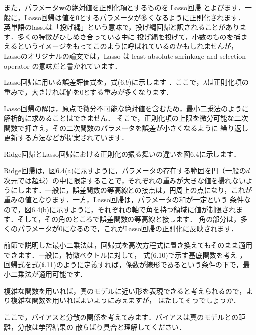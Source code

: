 
また，パラメータ$\bm{w}$の絶対値を正則化項とするものを
Lasso回帰
とよびます．一般に，Lasso回帰は値を0とするパラメータが多くなるように正則化されます．
英単語のlassoは「投げ縄」という意味で，投げ縄回帰と訳されることがあります．多くの特徴がひしめき合っている中に
投げ縄を投げて，小数のものを捕まえるというイメージをもってこのように呼ばれているのかもしれませんが，
Lassoのオリジナルの論文では，Lasso は least absolute shrinkage and selection operator の意味だと書かれています．

Lasso回帰に用いる誤差評価式を，式(6.9)に示します
．ここで，$\lambda$は正則化項の重みで，大きければ値を0とする重みが多くなります．


Lasso回帰の解は，原点で微分不可能な絶対値を含むため，最小二乗法のように解析的に求めることはできません．
そこで，正則化項の上限を微分可能な二次関数で押さえ，その二次関数のパラメータを誤差が小さくなるように
繰り返し更新する方法などが提案されています．


Ridge回帰とLasso回帰における正則化の振る舞いの違いを図6.4に示します．


Ridge回帰は，図6.4(a)に示すように，パラメータの存在する範囲を円（一般の$d$次元では超球）の中に限定することで，それぞれの重みが大きな値を撮れないようにします．一般に，誤差関数の等高線との接点は，円周上の点になり，これが重みの値となります．一方，Lasso回帰は，パラメータの和が一定という
条件なので，図6.4(b)に示すように，それぞれの軸で角を持つ領域に値が制限されます．そして，その角のところで誤差関数の等高線と接します．
角の部分は，多くのパラメータが0になるので，これがLasso回帰の正則化に反映されます．


前節で説明した最小二乗法は，回帰式を高次方程式に置き換えてもそのまま適用できます．一般に，特徴ベクトルに対して，
式(6.10)で示す基底関数を考え
，回帰式を式(6.11)のように定義すれば，係数が線形であるという条件の下で，最小二乗法が適用可能です．



複雑な関数を用いれば，真のモデルに近い形を表現できると考えられるので，より複雑な関数を用いればよいようにみえますが，
はたしてそうでしょうか．


ここで，バイアスと分散の関係を考えてみます．バイアスは真のモデルとの距離，分散は学習結果の
散らばり具合と理解してください．

